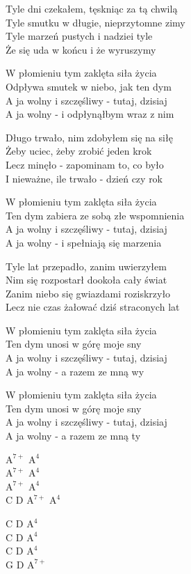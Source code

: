 \begin{text}
Tyle dni czekałem, tęskniąc za tą chwilą\\
Tyle smutku w długie, nieprzytomne zimy\\
Tyle marzeń pustych i nadziei tyle\\
Że się uda w końcu i że wyruszymy

W płomieniu tym zaklęta siła życia\\
Odpływa smutek w niebo, jak ten dym\\
A ja wolny i szczęśliwy - tutaj, dzisiaj\\
A ja wolny - i odpłynąłbym wraz z nim

Długo trwało, nim zdobyłem się na siłę\\
Żeby uciec, żeby zrobić jeden krok\\
Lecz minęło - zapominam to, co było\\
I nieważne, ile trwało - dzień czy rok

W płomieniu tym zaklęta siła życia\\
Ten dym zabiera ze sobą złe wspomnienia\\
A ja wolny i szczęśliwy - tutaj, dzisiaj\\
A ja wolny - i spełniają się marzenia

Tyle lat przepadło, zanim uwierzyłem\\
Nim się rozpostarł dookoła cały świat\\
Zanim niebo się gwiazdami roziskrzyło\\
Lecz nie czas żałować dziś straconych lat

W płomieniu tym zaklęta siła życia\\
Ten dym unosi w górę moje sny\\
A ja wolny i szczęśliwy - tutaj, dzisiaj\\
A ja wolny - a razem ze mną wy

W płomieniu tym zaklęta siła życia\\
Ten dym unosi w górę moje sny\\
A ja wolny i szczęśliwy - tutaj, dzisiaj\\
A ja wolny - a razem ze mną ty
\end{text}
\begin{chord}
    $\mathrm{A^{7+}}$ $\mathrm{A^4}$\\
    $\mathrm{A^{7+}}$ $\mathrm{A^4}$\\
    $\mathrm{A^{7+}}$ $\mathrm{A^4}$\\
    C D $\mathrm{A^{7+}}$ $\mathrm{A^4}$

    C D $\mathrm{A^4}$\\
    C D $\mathrm{A^4}$\\
    C D $\mathrm{A^4}$\\
    G D $\mathrm{A^{7+}}$
\end{chord}
